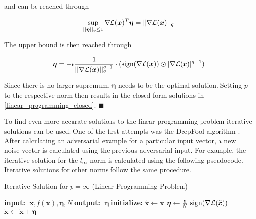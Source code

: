 and can be reached through

\begin{equation}
\begin{aligned}
	\sup_{\lvert\lvert \bm{\eta} \rvert\rvert_p \leq 1} \nabla \mathcal{L}(\bm{x})^T \bm{\eta} = \lvert\lvert \nabla \mathcal{L}(\bm{x}) \rvert\rvert_q
\end{aligned}
\label{linear_programming_sup}
\end{equation}

The upper bound is then reached through

\begin{equation}
\begin{aligned}
	\bm{\eta} = - \epsilon \frac{1}{\lvert\lvert \nabla \mathcal{L}(\bm{x}) \rvert\rvert_q^{q-1}} \cdot ( \text{sign}( \nabla \mathcal{L}(\bm{x}) ) \odot \lvert \nabla \mathcal{L}(\bm{x}) \rvert^{q-1} )
\end{aligned}
\label{linear_programming_solution}
\end{equation}

Since there is no larger supremum, $\bm{\eta}$ needs to be the optimal solution.
Setting $p$ to the respective norm then results in the closed-form solutions in \ref{linear_programming_closed}. $ \blacksquare $

\begingroup
To find even more accurate solutions to the linear programming problem iterative solutions can be used. One of the first attempts was the
DeepFool algorithm \cite{DeepFool}. After calculating an adversarial example for a particular input vector, a new noise vector is calculated
using the previous adversarial input. For example, the iterative solution for the $l_{\infty}$-norm
is calculated using the following pseudocode. Iterative solutions for other norms follow the same procedure.
\endgroup


\begin{algorithm}
\caption{Iterative Solution for $p = \infty$ (Linear Programming Problem)}
\label{alg:euclid}
\begin{algorithmic}[1]
\State \textbf{input:} $\; \bm{x}, f(\bm{x}), \bm{\eta}, N$
\State \textbf{output:} $\; \bm{\eta}$
\State \textbf{initialize:} $\bm{\tilde{x}} \gets \bm{x}$
	\State $ \bm{\eta} \gets \frac{\bm{\epsilon}}{N} \; \text{sign}(\nabla \mathcal{L}(\bm{\tilde{x}})) $
	\State $ \bm{\tilde{x}} \gets \bm{\tilde{x}} + \bm{\eta} $
\EndFor
\end{algorithmic}
\end{algorithm}



